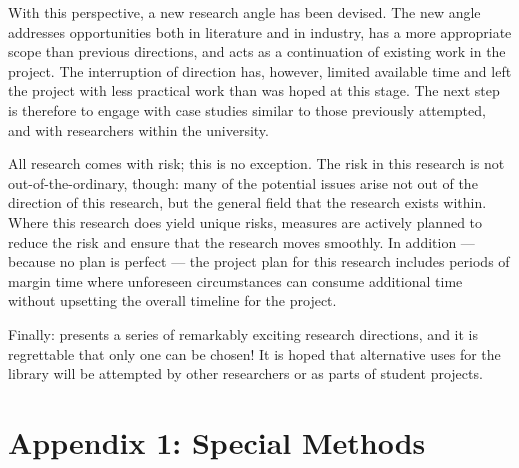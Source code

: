 \documentclass{article}
\begin{document}
With this perspective, a new research angle has been devised. The new angle
addresses opportunities both in literature and in industry, has a more
appropriate scope than previous directions, and acts as a continuation of
existing work in the project\cite{caise_forum_18}. The interruption of direction
has, however, limited available time and left the project with less practical
work than was hoped at this stage. The next step is therefore to engage with
case studies similar to those previously attempted, and with researchers within
the university.\par

All research comes with risk; this is no exception. The risk in this research is
not out-of-the-ordinary, though: many of the potential issues arise not out of
the direction of this research, but the general field that the research exists
within. Where this research does yield unique risks, measures are actively
planned to reduce the risk and ensure that the research moves smoothly. In
addition --- because no plan is perfect --- the project plan for this research
includes periods of margin time where unforeseen circumstances can consume
additional time without upsetting the overall timeline for the project.\par

Finally: \pdsf{} presents a series of remarkably exciting research directions,
and it is regrettable that only one can be chosen! It is hoped that alternative
uses for the library will be attempted by other researchers or as parts of
student projects.\par











\appendix

\newpage
\section*{Appendix 1: \pdsf{} Special Methods}
\label{app:special_methods}
\end{document}
